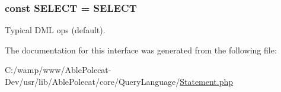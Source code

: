 \subsubsection[{S\+E\+L\+E\+C\+T}]{\setlength{\rightskip}{0pt plus 5cm}const S\+E\+L\+E\+C\+T = \textquotesingle{}S\+E\+L\+E\+C\+T\textquotesingle{}}\label{interface_able_polecat___query_language___statement_interface_a35973b14dbe24cfc841a4f19db764f28}
Typical D\+M\+L ops (default). 

The documentation for this interface was generated from the following file\+:\begin{DoxyCompactItemize}
\item 
C\+:/wamp/www/\+Able\+Polecat-\/\+Dev/usr/lib/\+Able\+Polecat/core/\+Query\+Language/\hyperlink{_statement_8php}{Statement.\+php}\end{DoxyCompactItemize}
